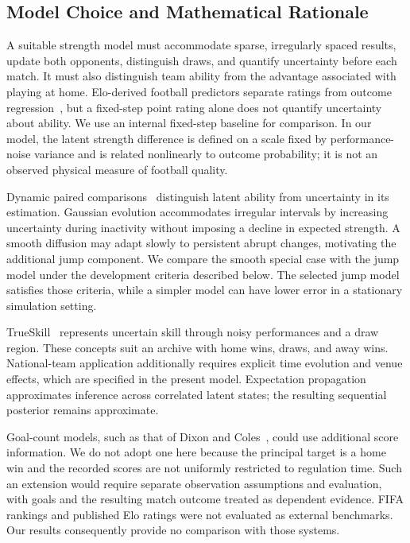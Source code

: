\subsection{Model Choice and Mathematical Rationale}
\label{sec:model-choice}

A suitable strength model must accommodate sparse, irregularly spaced results, update both opponents, distinguish draws, and quantify uncertainty before each match. It must also distinguish team ability from the advantage associated with playing at home. Elo-derived football predictors separate ratings from outcome regression~\cite{hvattum2010elo}, but a fixed-step point rating alone does not quantify uncertainty about ability. We use an internal fixed-step baseline for comparison. In our model, the latent strength difference is defined on a scale fixed by performance-noise variance and is related nonlinearly to outcome probability; it is not an observed physical measure of football quality.

Dynamic paired comparisons~\cite{glickman1999dynamic} distinguish latent ability from uncertainty in its estimation. Gaussian evolution accommodates irregular intervals by increasing uncertainty during inactivity without imposing a decline in expected strength. A smooth diffusion may adapt slowly to persistent abrupt changes, motivating the additional jump component. We compare the smooth special case with the jump model under the development criteria described below. The selected jump model satisfies those criteria, while a simpler model can have lower error in a stationary simulation setting.

TrueSkill~\cite{herbrich2006trueskill} represents uncertain skill through noisy performances and a draw region. These concepts suit an archive with home wins, draws, and away wins. National-team application additionally requires explicit time evolution and venue effects, which are specified in the present model. Expectation propagation~\cite{minka2001ep} approximates inference across correlated latent states; the resulting sequential posterior remains approximate.

Goal-count models, such as that of Dixon and Coles~\cite{dixon1997scores}, could use additional score information. We do not adopt one here because the principal target is a home win and the recorded scores are not uniformly restricted to regulation time. Such an extension would require separate observation assumptions and evaluation, with goals and the resulting match outcome treated as dependent evidence. FIFA rankings and published Elo ratings were not evaluated as external benchmarks. Our results consequently provide no comparison with those systems.

